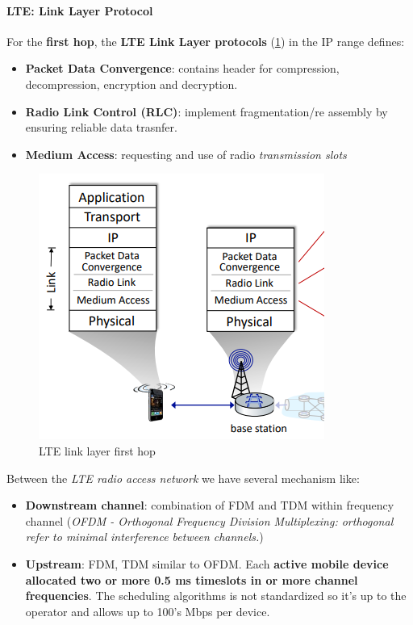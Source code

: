 \documentclass[10pt,a4paper]{report}
\theoremstyle{definition}
\begin{document}
\paragraph{LTE: Link Layer Protocol}\label{sec:lte-link-layer-protocol}
For the \textbf{first hop}, the  \textbf{LTE Link Layer protocols} (\ref{first-hop-link-layer}) in the IP range defines:
\begin{itemize}
	\item 
	\textbf{Packet Data Convergence}: contains header for compression, decompression, encryption and decryption.
	\item 
	\textbf{Radio Link Control (RLC)}: implement fragmentation/re assembly by ensuring reliable data trasnfer.
	\item 
	\textbf{Medium Access}: requesting and use of radio \textit{transmission slots}
	
	
\end{itemize}
\begin{figure}[h]
	\centering\includegraphics[scale=0.50]{images/Pasted image 20230308165650.png}
	\caption{LTE link layer first hop}
	\label{first-hop-link-layer}	
\end{figure}

Between the \textit{LTE radio access network} we have several mechanism like:
\begin{itemize}
	\item 
	\textbf{Downstream channel}: combination of FDM and TDM within frequency channel (\textit{OFDM - Orthogonal Frequency Division Multiplexing: orthogonal refer to minimal interference between channels.})
	\item 
	\textbf{Upstream}: FDM, TDM similar to OFDM.
	Each \textbf{active mobile device allocated two or more 0.5 ms timeslots in or more channel frequencies}. The scheduling algorithms is not standardized so it's up to the operator and allows up to 100's Mbps per device.
\end{itemize}
\end{document}
